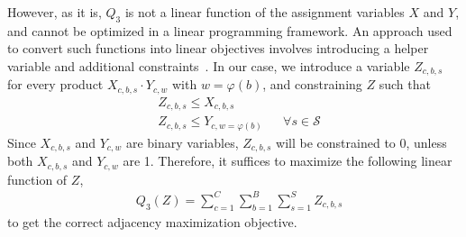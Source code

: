However, as it is, $Q_3$ is not a linear function of the assignment variables
$X$ and $Y$, and cannot be optimized in a linear programming framework. 
An approach used to convert such
functions into linear objectives involves introducing a helper variable and
additional constraints~\cite{hammer_boolean_1968}. 
In our case, we introduce a variable $Z_{c, b, s}$ 
for every product $X_{c, b, s} \cdot Y_{c, w}$ with $w = \varphi(b)$, and
constraining $Z$ such that 
\begin{align}
&Z_{c, b, s} \leq X_{c, b, s} \label{eqn:helper-x-constraint}\\
&Z_{c, b, s} \leq Y_{c, w=\varphi(b)} &&\forall s\in\mathcal{S}
\label{eqn:helper-y-constraint}
\end{align}
Since $X_{c, b, s}$ and $Y_{c, w}$ are binary variables, $Z_{c, b, s}$ will be constrained
to 0, unless both $X_{c, b, s}$ and $Y_{c, w}$ are 1. Therefore, it suffices to maximize
the following linear function of $Z$,
\begin{align}
&Q_3(Z) = \sum_{c=1}^{C} \sum_{b=1}^{B} \sum_{s=1}^{S} Z_{c, b, s}
\end{align}
to get the correct adjacency maximization objective.

